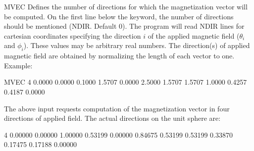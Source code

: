 \begin{keywordlist}
\item[MVEC]
Defines the number of directions for which the magnetization vector will be computed.
On the first line below the keyword, the number of directions should be mentioned (NDIR. Default 0).
The program will read NDIR lines for cartesian coordinates specifying the direction $i$ of the
applied magnetic field ($\theta_i$ and $\phi_i$). These values may be arbitrary real numbers.
The direction(s) of applied magnetic field are obtained by normalizing the length of each vector to one.
Example:
\begin{inputlisting}
MVEC
4
0.0000  0.0000   0.1000
1.5707  0.0000   2.5000
1.5707  1.5707   1.0000
0.4257  0.4187   0.0000
\end{inputlisting}
The above input requests computation of the magnetization vector in four directions of applied field.
The actual directions on the unit sphere are:
\begin{sourcelisting}
4
0.00000  0.00000  1.00000
0.53199  0.00000  0.84675
0.53199  0.53199  0.33870
0.17475  0.17188  0.00000
\end{sourcelisting}





\end{keywordlist}

